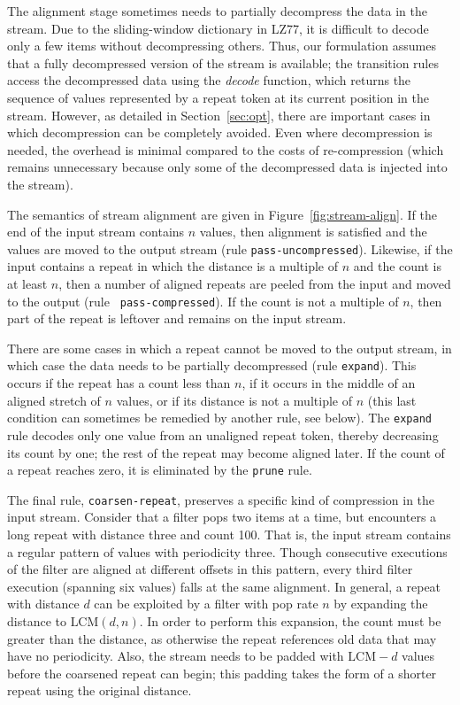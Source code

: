 The alignment stage sometimes needs to partially decompress the data
in the stream.  Due to the sliding-window dictionary in LZ77, it is
difficult to decode only a few items without decompressing others.
Thus, our formulation assumes that a fully decompressed version of the
stream is available; the transition rules access the decompressed data
using the \mbox{\it decode} function, which returns the sequence of
values represented by a repeat token at its current position in the
stream.  However, as detailed in Section~\ref{sec:opt}, there are
important cases in which decompression can be completely avoided.
Even where decompression is needed, the overhead is minimal compared
to the costs of re-compression (which remains unnecessary because only
some of the decompressed data is injected into the stream).

The semantics of stream alignment are given in
Figure~\ref{fig:stream-align}.  If the end of the input stream
contains $n$ values, then alignment is satisfied and the values are
moved to the output stream (rule {\tt pass-uncompressed}).  Likewise,
if the input contains a repeat in which the distance is a multiple of
$n$ and the count is at least $n$, then a number of aligned repeats
are peeled from the input and moved to the output (rule {\tt
  pass-compressed}).  If the count is not a multiple of $n$, then part
of the repeat is leftover and remains on the input stream.

There are some cases in which a repeat cannot be moved to the output
stream, in which case the data needs to be partially decompressed
(rule {\tt expand}).  This occurs if the repeat has a count less than
$n$, if it occurs in the middle of an aligned stretch of $n$ values,
or if its distance is not a multiple of $n$ (this last condition can
sometimes be remedied by another rule, see below).  The {\tt expand}
rule decodes only one value from an unaligned repeat token, thereby
decreasing its count by one; the rest of the repeat may become aligned
later.  If the count of a repeat reaches zero, it is eliminated by the
{\tt prune} rule.

The final rule, {\tt coarsen-repeat}, preserves a specific kind of
compression in the input stream.  Consider that a filter pops two
items at a time, but encounters a long repeat with distance three and
count 100.  That is, the input stream contains a regular pattern of
values with periodicity three.  Though consecutive executions of the
filter are aligned at different offsets in this pattern, every third
filter execution (spanning six values) falls at the same alignment.
In general, a repeat with distance $d$ can be exploited by a filter
with pop rate $n$ by expanding the distance to $\mbox{LCM}(d, n)$.  In
order to perform this expansion, the count must be greater than the
distance, as otherwise the repeat references old data that may have no
periodicity.  Also, the stream needs to be padded with $\mbox{LCM}-d$
values before the coarsened repeat can begin; this padding takes the
form of a shorter repeat using the original distance.

